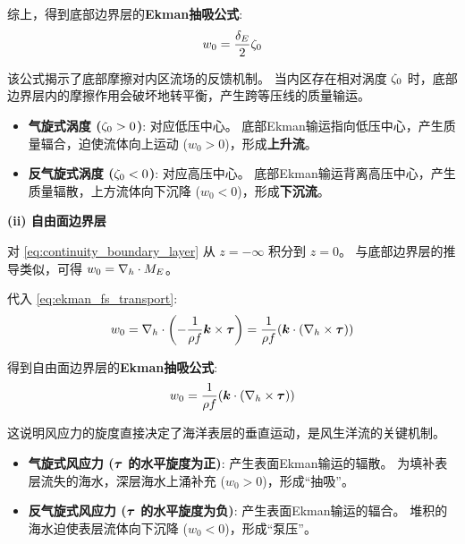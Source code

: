 综上，得到底部边界层的\textbf{Ekman抽吸公式}:
\begin{equation}
    w_0 = \frac{\delta_E}{2} \zeta_0
    \label{eq:ekman_pumping}
\end{equation}

该公式揭示了底部摩擦对内区流场的反馈机制。
当内区存在相对涡度 $\zeta_0$ 时，底部边界层内的摩擦作用会破坏地转平衡，产生跨等压线的质量输运。

\begin{itemize}
    \item \textbf{气旋式涡度 ($\zeta_0 > 0$)}: 对应低压中心。
    底部Ekman输运指向低压中心，产生质量辐合，迫使流体向上运动 ($w_0 > 0$)，形成\textbf{上升流}。
    \item \textbf{反气旋式涡度 ($\zeta_0 < 0$)}: 对应高压中心。
    底部Ekman输运背离高压中心，产生质量辐散，上方流体向下沉降 ($w_0 < 0$)，形成\textbf{下沉流}。
\end{itemize}

\textbf{(ii) 自由面边界层}

对 \eqref{eq:continuity_boundary_layer} 从 $z = -\infty$ 积分到 $z = 0$。
与底部边界层的推导类似，可得 $w_0 = \nabla_h \cdot M_E$。

代入 \eqref{eq:ekman_fs_transport}:
\begin{equation*}
    w_0 = \nabla_h \cdot \left(-\frac{1}{\rho f} \bm{k} \times {\bm{\tau}}\right) = \frac{1}{\rho f} (\bm{k} \cdot (\nabla_h \times {\bm{\tau}}))
\end{equation*}

得到自由面边界层的\textbf{Ekman抽吸公式}:
\begin{equation}
    w_0 = \frac{1}{\rho f} (\bm{k} \cdot (\nabla_h \times {\bm{\tau}}))
    \label{eq:ekman_pumping_fs}
\end{equation}

这说明风应力的旋度直接决定了海洋表层的垂直运动，是风生洋流的关键机制。

\begin{itemize}
    \item \textbf{气旋式风应力 (${\bm{\tau}}$ 的水平旋度为正)}: 产生表面Ekman输运的辐散。
    为填补表层流失的海水，深层海水上涌补充 ($w_0 > 0$)，形成“抽吸”。
    \item \textbf{反气旋式风应力 (${\bm{\tau}}$ 的水平旋度为负)}: 产生表面Ekman输运的辐合。
    堆积的海水迫使表层流体向下沉降 ($w_0 < 0$)，形成“泵压”。
\end{itemize}

